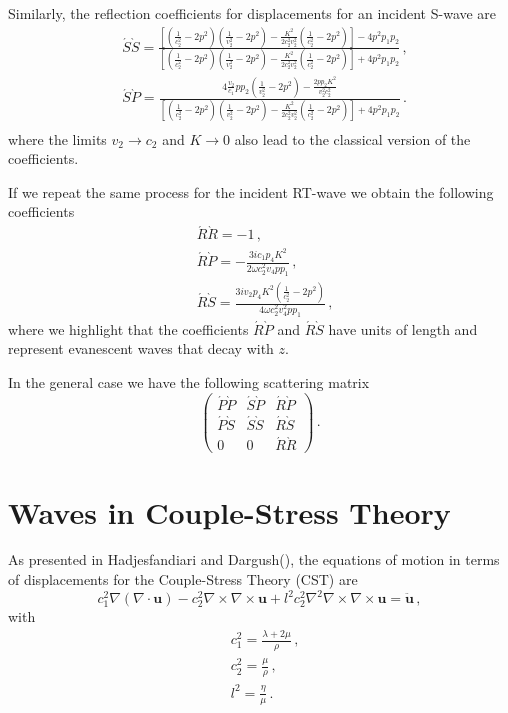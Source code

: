 \documentclass[12pt]{article}
\begin{document}
Similarly, the reflection coefficients for displacements for an incident S-wave are
\begin{align}
&\acute{S}\grave{S} = \frac{\left[\left(\frac{1}{c_2^2} - 2 p^2\right)\left(\frac{1}{v_2^2} - 2 p^2\right) - \frac{K^2}{2 c_2^2 v_2^2}\left(\frac{1}{c_2^2} - 2 p^2\right)\right] - 4 p^2 p_1 p_2} {\left[\left(\frac{1}{c_2^2} - 2 p^2\right)\left(\frac{1}{v_2^2} - 2 p^2\right) - \frac{K^2}{2 c_2^2 v_2^2}\left(\frac{1}{c_2^2} - 2 p^2\right)\right] + 4 p^2 p_1 p_2}\, ,\\
&\acute{S}\grave{P} = \frac{4 \frac{v_2}{c_1} p p_2\left(\frac{1}{v_2^2} - 2 p^2\right) - \frac{2 p p_2 K^2}{v_2^2 c_2^2}} {\left[\left(\frac{1}{c_2^2} - 2 p^2\right)\left(\frac{1}{v_2^2} - 2 p^2\right) - \frac{K^2}{2 c_2^2 v_2^2}\left(\frac{1}{c_2^2} - 2 p^2\right)\right] + 4 p^2 p_1 p_2}\, .\\
\end{align}
where the limits \(v_2 \rightarrow c_2\) and \(K \rightarrow 0\) also lead to the classical version of the coefficients.

If we repeat the same process for the incident RT-wave we obtain the following coefficients
\begin{align}
&\acute{R}\grave{R} = -1\, ,\\
&\acute{R}\grave{P} = -\frac{3i c_1 p_4 K^2}{2 \omega c_2^2 v_4 p p_1}\, ,\\
&\acute{R}\grave{S} = \frac{3i v_2 p_4 K^2\left(\frac{1}{c_2^2} - 2 p^2\right)}{4 \omega c_2^2 v_4^2 p p_1}\, ,
\end{align}
where we highlight that the coefficients \(\acute{R}\grave{P}\) and \(\acute{R}\grave{S}\) have units of length and represent evanescent waves that decay with \(z\).

In the general case we have the following scattering matrix
\[\begin{pmatrix}
\acute{P}\grave{P} &\acute{S}\grave{P} &\acute{R}\grave{P}\\
\acute{P}\grave{S} &\acute{S}\grave{S} &\acute{R}\grave{S}\\
0 &0 &\acute{R}\grave{R}
\end{pmatrix}\, .\]


\section{Waves in Couple-Stress Theory}
As presented in Hadjesfandiari and Dargush(), the equations of motion in terms of displacements for the Couple-Stress Theory (CST) are
\[c_1^2 \nabla (\nabla \cdot \mathbf{u}) - c_2^2\nabla\times \nabla \times \mathbf{u} + l^2 c_2^2 \nabla^2 \nabla \times \nabla \times \mathbf{u} = \ddot{\mathbf{u}}\, ,\]
with
\begin{align*}
&c_1^2 = \frac{\lambda + 2\mu}{\rho}\, ,\\
&c_2^2 = \frac{\mu}{\rho}\, ,\\
&l^2 = \frac{\eta}{\mu}\, .
\end{align*}
\end{document}
